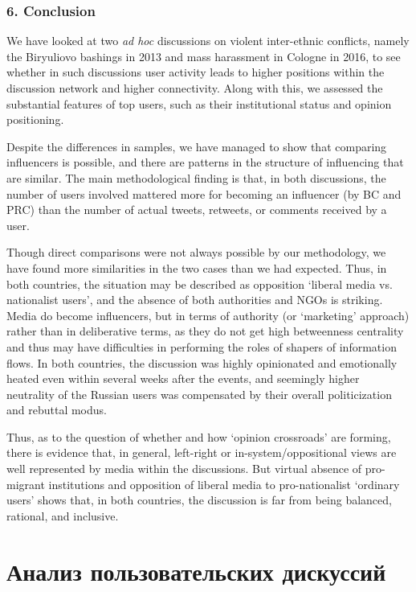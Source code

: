 \subsubsection{6. Conclusion}

We have looked at two \textit{ad hoc} discussions on violent inter-ethnic conflicts, namely the Biryuliovo bashings in 2013 and mass harassment in Cologne in 2016, to see whether in such discussions user activity leads to higher positions within the discussion network and higher connectivity. Along with this, we assessed the substantial features of top users, such as their institutional status and opinion positioning.

Despite the differences in samples, we have managed to show that comparing influencers is possible, and there are patterns in the structure of influencing that are similar. The main methodological finding is that, in both discussions, the number of users involved mattered more for becoming an influencer (by BC and PRC) than the number of actual tweets, retweets, or comments received by a user.

Though direct comparisons were not always possible by our methodology, we have found more similarities in the two cases than we had expected. Thus, in both countries, the situation may be described as opposition ‘liberal media vs. nationalist users’, and the absence of both authorities and NGOs is striking. Media do become influencers, but in terms of authority (or ‘marketing’ approach) rather than in deliberative terms, as they do not get high betweenness centrality and thus may have difficulties in performing the roles of shapers of information flows. In both countries, the discussion was highly opinionated and emotionally heated even within several weeks after the events, and seemingly higher neutrality of the Russian users was compensated by their overall politicization and rebuttal modus.

Thus, as to the question of whether and how ‘opinion crossroads’ are forming, there is evidence that, in general, left-right or in-system/oppositional views are well represented by media within the discussions. But virtual absence of pro-migrant institutions and opposition of liberal media to pro-nationalist ‘ordinary users’ shows that, in both countries, the discussion is far from being balanced, rational, and inclusive.

\section{Анализ пользовательских дискуссий}\label{sec:ch2/sec5}

